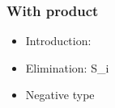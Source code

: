 \documentclass{beamer}
\begin{document}
  \begin{frame}
    \frametitle{With product}
    \begin{itemize}
    \item Introduction:
                {\ctx{\Gamma}{\Delta} \vdash {} \ni {}}
      \bigskip
    \item Elimination:
                {\ctx{\Gamma}{\Delta} \vdash {} \in S_i}
      \bigskip
    \item Negative type
    \end{itemize}
  \end{frame}
\end{document}
